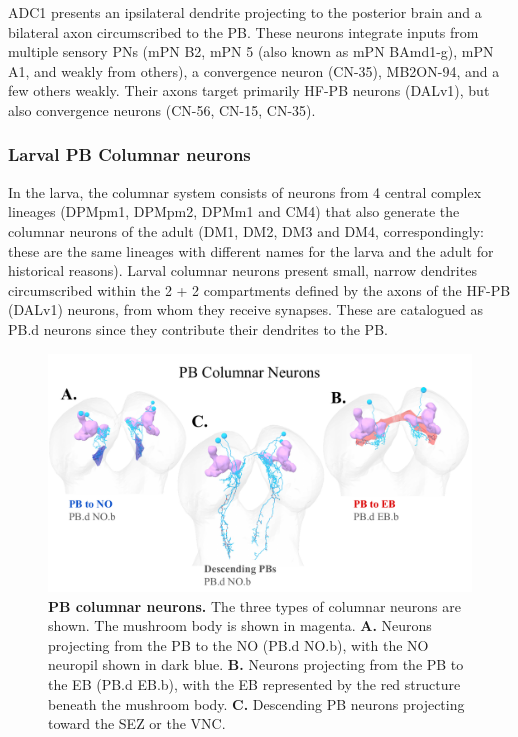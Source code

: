     ADC1 presents an ipsilateral dendrite projecting to the posterior brain and a bilateral axon circumscribed to the PB. These neurons integrate inputs from multiple sensory PNs (mPN B2, mPN 5 (also known as mPN BAmd1-g), mPN A1, and weakly from others), a convergence neuron (CN-35), MB2ON-94, and a few others weakly. Their axons target primarily HF-PB neurons (DALv1), but also convergence neurons  (CN-56, CN-15, CN-35).
 
        \subsubsection{Larval PB Columnar neurons}

    In the larva, the columnar system consists of neurons from 4 central complex lineages (DPMpm1, DPMpm2, DPMm1 and CM4) that also generate the columnar neurons of the adult (DM1, DM2, DM3 and DM4, correspondingly: these are the same lineages with different names for the larva and the adult for historical reasons).
    Larval columnar neurons present small, narrow dendrites circumscribed within the 2 + 2 compartments defined by the axons of the HF-PB (DALv1) neurons, from whom they receive synapses. These are catalogued as PB.d neurons since they contribute their dendrites to the PB.

        \begin{figure}[H]
            \centering
            \includegraphics[width=12cm]{Figs/CX/PBcolumnar.pdf}
            \caption[PB columnar neurons]{\textbf{PB columnar neurons.} The three types of columnar neurons are shown. The mushroom body is shown in magenta. \textbf{A.} Neurons projecting from the PB to the NO (PB.d NO.b), with the NO neuropil shown in dark blue. \textbf{B.} Neurons projecting from the PB to the EB (PB.d EB.b), with the EB represented by the red structure beneath the mushroom body. \textbf{C.} Descending PB neurons projecting toward the SEZ or the VNC.}
            \label{pbcolumnar}
        \end{figure}

